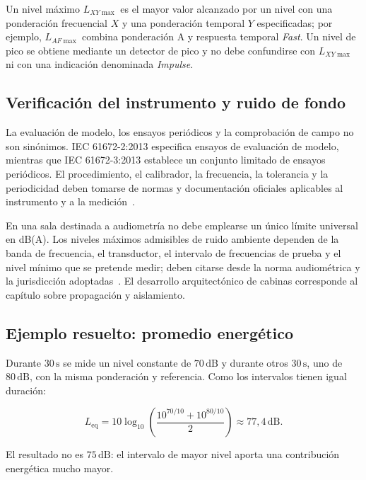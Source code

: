 Un nivel máximo \(L_{XY\max}\) es el mayor valor alcanzado por un nivel con una
ponderación frecuencial \(X\) y una ponderación temporal \(Y\) especificadas;
por ejemplo, \(L_{AF\max}\) combina ponderación A y respuesta temporal
\emph{Fast}. Un nivel de pico se obtiene mediante un detector de pico y no
debe confundirse con \(L_{XY\max}\) ni con una indicación denominada
\emph{Impulse}.

\subsection{Verificación del instrumento y ruido de fondo}
\label{sec:u5-verificacion-sonometro}

La evaluación de modelo, los ensayos periódicos y la comprobación de campo no
son sinónimos. IEC 61672-2:2013 especifica ensayos de evaluación de modelo,
mientras que IEC 61672-3:2013 establece un conjunto limitado de ensayos
periódicos. El procedimiento, el calibrador, la frecuencia, la tolerancia y la
periodicidad deben tomarse de normas y documentación oficiales aplicables al
instrumento y a la medición~\cite{iec61672_1_2013,iec61672_2_2013,iec61672_3_2013}.

En una sala destinada a audiometría no debe emplearse un único límite universal
en dB(A). Los niveles máximos admisibles de ruido ambiente dependen de
la banda de frecuencia, el transductor, el intervalo de frecuencias de prueba
y el nivel mínimo que se pretende medir; deben citarse desde la norma
audiométrica y la jurisdicción adoptadas~\cite{iso8253_1_2010,ansiS31_2023}. El desarrollo arquitectónico de
cabinas corresponde al capítulo sobre propagación y aislamiento.

\subsection{Ejemplo resuelto: promedio energético}
\label{sec:u5-ejemplo-leq}

Durante \(30\,\text{s}\) se mide un nivel constante de \(70\,\text{dB}\) y
durante otros \(30\,\text{s}\), uno de \(80\,\text{dB}\), con la misma
ponderación y referencia. Como los intervalos tienen igual duración:

\[
    L_\mathrm{eq}
    =10\log_{10}
    \left(
        \frac{10^{70/10}+10^{80/10}}{2}
    \right)
    \approx77{,}4\,\text{dB}.
\]

El resultado no es \(75\,\text{dB}\): el intervalo de mayor nivel aporta una
contribución energética mucho mayor.

